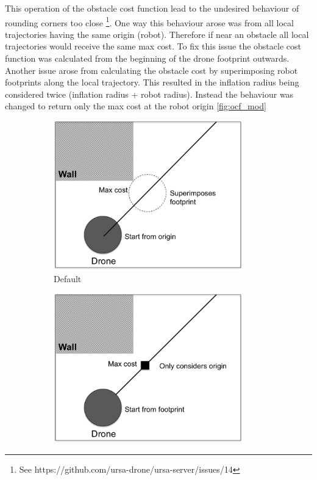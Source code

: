 \documentclass[capstone_report.tex]{subfiles}
\begin{document}
This operation of the obstacle cost function lead to the undesired behaviour of rounding corners too close \footnote{See https://github.com/ursa-drone/ursa-server/issues/14}.  One way this behaviour arose was from all local trajectories having the same origin (robot).  Therefore if near an obstacle all local trajectories would receive the same max cost.  To fix this issue the obstacle cost function was calculated from the beginning of the drone footprint outwards.  Another issue arose from calculating the  obstacle cost by superimposing robot footprints along the local trajectory.  This resulted in the inflation radius being considered twice (inflation radius + robot radius).  Instead the behaviour was changed to return only the max cost at the robot origin \ref{fig:ocf_mod}

\begin{figure}[H]
    \centering
    \begin{subfigure}{0.5\textwidth}
        \centering
        \includegraphics[width=0.9\textwidth]{imgs/ocf_default.png}
        \caption{Default}
        \label{fig:ocf_default}
    \end{subfigure}%
    \begin{subfigure}{0.5\textwidth}
        \centering
        \includegraphics[width=0.9\textwidth]{imgs/ocf_mod.png}

\end{subfigure}
\end{figure}
\end{document}
